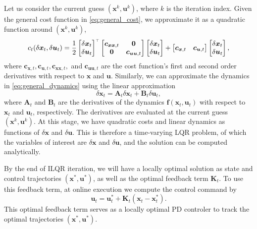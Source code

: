 Let us consider the current guess $(\bm{x}^k, \bm{u}^k)$, where $k$ is the iteration index. Given the general cost function in \eqref{eq:general_cost}, we approximate it as a quadratic function around $(\bm{x}^k, \bm{u}^k)$,
\begin{multline} 
\hfill
\centering
c_t(\delta\bm{x}_t, \delta\bm{u}_t) = \frac{1}{2} 
\begin{bmatrix}
\delta \bm{x}_t \\ \delta \bm{u}_t 
\end{bmatrix}
^\trsp
\begin{bmatrix}
\bm{c}_{\bm{xx},t} & \bm{0} \\ \bm{0} & \bm{c}_{\bm{uu},t}
\end{bmatrix}
\begin{bmatrix}
\delta \bm{x}_t \\ \delta \bm{u}_t 
\end{bmatrix}
 + 
\begin{bmatrix}
\bm{c}_{\bm{x},t} &  \bm{c}_{\bm{u},t}
\end{bmatrix}
\begin{bmatrix}
\delta \bm{x}_t \\ \delta \bm{u}_t 
\end{bmatrix},
\label{eq:quadratized_cost}
\end{multline}
where $\bm{c}_{\bm{x},t}, \bm{c}_{\bm{u},t}, \bm{c}_{\bm{xx},t},$ and $\bm{c}_{\bm{uu},t}$ are the cost function's first and second order derivatives with respect to $\bm{x}$ and $\bm{u}$. Similarly, we can approximate the dynamics in \eqref{eq:general_dynamics} using the linear approximation
\begin{equation}
\delta \bm{x}_t = \bm{A}_t \delta \bm{x}_t + \bm{B}_t \delta \bm{u}_t,
\label{eq:linearized_dynamics}
\end{equation}
where $\bm{A}_t$ and $\bm{B}_t$ are the derivatives of the dynamics $\bm{f}(\bm{x}_t, \bm{u}_t)$ with respect to $\bm{x}_t$ and $\bm{u}_t$, respectively. The derivatives are evaluated at the current guess $(\bm{x}^k, \bm{u}^k)$. At this stage, we have quadratic costs and linear dynamics as functions of $\delta\bm{x}$ and $\delta\bm{u}$. This is therefore a time-varying LQR problem, of which the variables of interest are $\delta\bm{x}$ and $\delta\bm{u}$, and the solution can be computed analytically. 

By the end of ILQR iteration, we will have a locally optimal solution as state and control trajectories $(\bm{x}^*, \bm{u}^*)$, as well as the optimal feedback term $\bm{K}_t$. To use this feedback term, at online execution we compute the control command by 
\begin{equation}
\bm{u}_t = \bm{u}_t^* + \bm{K}_t (\bm{x}_t - \bm{x}_t^*).
\end{equation}
This optimal feedback term serves as a locally optimal PD controler to track the optimal trajectories $(\bm{x}^*, \bm{u}^*)$. 

